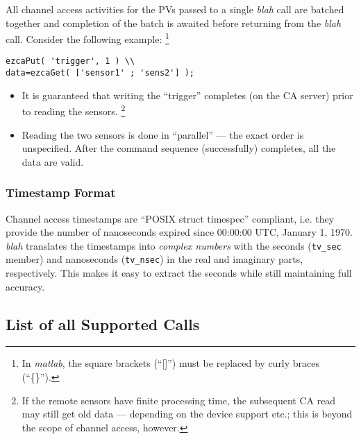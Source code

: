 \documentclass{article}
\newcommand{\sca}{{\em blah}}
\newcommand{\matlab}{{\em matlab}}
\begin{document}
All channel access activities for the PVs
passed to a single \sca{} call are batched together and
completion of the batch is awaited before returning from
the \sca{} call. Consider the following example:%
\footnote{
In \matlab{}, the square brackets (``[]'') must be replaced
by curly braces (``\{\}'').}
\begin{verbatim}
ezcaPut( 'trigger', 1 ) \\
data=ezcaGet( ['sensor1' ; 'sens2'] );
\end{verbatim}
\begin{itemize}
%
\item It is guaranteed that writing the ``trigger''
completes (on the CA server) prior to reading the
sensors.%
\footnote{If the remote sensors have finite
processing time, the subsequent CA read may still
get old data --- depending on the device support
etc.; this is beyond the scope of channel access, however.}
%
\item Reading the two sensors is done in ``parallel'' ---
the exact order is unspecified. After the command sequence
(successfully) completes, all the data are valid.
\end{itemize}

\subsubsection{Timestamp Format}
\label{tsformat}
Channel access timestamps are ``POSIX struct timespec''
compliant, i.e. they provide the number of nanoseconds
expired since 00:00:00 UTC, January 1, 1970. \sca{} 
translates the timestamps into {\em complex numbers}
with the seconds ({\tt tv\_sec} member) and nanoseconds
({\tt tv\_nsec}) in the real and imaginary parts, respectively.
This makes it easy to extract the seconds while still maintaining
full accuracy.

\subsection{List of all Supported Calls}
\end{document}
